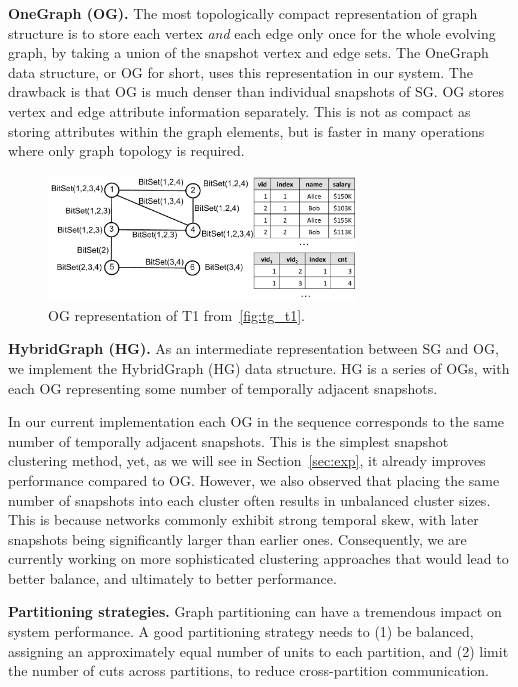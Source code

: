 {\bf OneGraph (OG).}  The most topologically compact representation of
graph structure is to store each vertex {\em and} each edge only once
for the whole evolving graph, by taking a union of the snapshot vertex
and edge sets.  The OneGraph data structure, or OG for short, uses
this representation in our system.  The drawback is that OG is much
denser than individual snapshots of SG.  OG stores vertex and edge
attribute information separately.  This is not as compact as storing
attributes within the graph elements, but is faster in many operations
where only graph topology is required.

\begin{figure}[t!]
\includegraphics[width=3.2in]{figs/ogc.pdf}
\vspace{-0.3cm}
\caption{OG representation of T1 from~\ref{fig:tg_t1}.}
\vspace{-0.5cm}
\label{fig:ogc}
\end{figure}

{\bf HybridGraph (HG).} As an intermediate representation between SG
and OG, we implement the HybridGraph (HG) data structure.  HG is a
series of OGs, with each OG representing some number of temporally
adjacent snapshots.

In our current implementation each OG in the sequence corresponds to
the same number of temporally adjacent snapshots.  This is the
simplest snapshot clustering method, yet, as we will see in
Section~\ref{sec:exp}, it already improves performance
compared to OG.  However, we also observed that placing the same
number of snapshots into each cluster often results in unbalanced
cluster sizes.  This is because networks commonly exhibit strong
temporal skew, with later snapshots being significantly larger than
earlier ones.  Consequently, we are currently working on more
sophisticated clustering approaches that would lead to better balance,
and ultimately to better performance.

{\bf Partitioning strategies.}  Graph partitioning can have a
tremendous impact on system performance.  A good partitioning strategy
needs to (1) be balanced, assigning an approximately equal number of
units to each partition, and (2) limit the number of cuts across
partitions, to reduce cross-partition communication.

